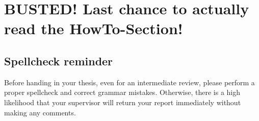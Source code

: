 
\ifLSRITRtutorial
	\chapter{BUSTED! Last chance to actually read the HowTo-Section!}
	
%	
%	
	
	
%	
%	

\section{Spellcheck reminder}
Before handing in your thesis, even for an intermediate review, please perform a proper spellcheck and correct grammar mistakes. Otherwise, there is a high likelihood that your supervisor will return your report immediately without making any comments.
\fi